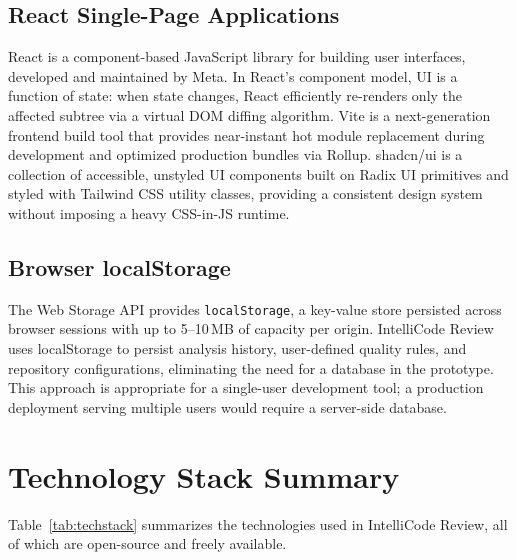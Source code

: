 \documentclass[12pt, oneside]{report}
\begin{document}
\subsection{React Single-Page Applications}

React is a component-based JavaScript library for building user interfaces, developed
and maintained by Meta. In React's component model, UI is a function of state: when
state changes, React efficiently re-renders only the affected subtree via a virtual DOM
diffing algorithm. Vite is a next-generation frontend build tool that provides near-instant
hot module replacement during development and optimized production bundles via Rollup.
shadcn/ui is a collection of accessible, unstyled UI components built on Radix UI
primitives and styled with Tailwind CSS utility classes, providing a consistent design
system without imposing a heavy CSS-in-JS runtime.

\subsection{Browser localStorage}

The Web Storage API provides \texttt{localStorage}, a key-value store persisted across
browser sessions with up to 5--10\,MB of capacity per origin. IntelliCode Review uses
localStorage to persist analysis history, user-defined quality rules, and repository
configurations, eliminating the need for a database in the prototype. This approach is
appropriate for a single-user development tool; a production deployment serving multiple
users would require a server-side database.

\section{Technology Stack Summary}
\label{sec:bg-techstack}

Table~\ref{tab:techstack} summarizes the technologies used in IntelliCode Review, all of
which are open-source and freely available.
\end{document}
